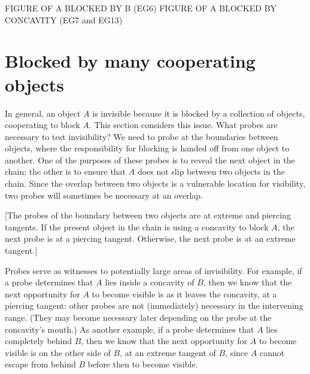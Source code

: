\documentclass[12pt]{article}
\begin{document}
FIGURE OF A BLOCKED BY B (EG6)
FIGURE OF A BLOCKED BY CONCAVITY (EG7 and EG13)




\section{Blocked by many cooperating objects}

In general, an object $A$ is invisible because it is blocked by 
a collection of objects, cooperating to block $A$.
This section considers this issue.
What probes are necessary to test invisibility?
We need to probe at the boundaries between objects, where the responsibility
for blocking is handed off from one object to another.
One of the purposes of these probes is to reveal the next object in the chain;
the other is to ensure that $A$ does not slip between two objects in the chain.
Since the overlap between two objects is a vulnerable location for visibility,
two probes will sometimes be necessary at an overlap.

[The probes of the boundary between two objects are at extreme and piercing tangents.
If the present object in the chain is using a concavity to block $A$, 
the next probe is at a piercing tangent.
Otherwise, the next probe is at an extreme tangent.]

Probes serve as witnesses to potentially large areas of invisibility.
For example, if a probe determines that $A$ lies inside a concavity of $B$,
then we know that the next opportunity for $A$ to become visible is as it leaves
the concavity, at a piercing tangent: 
other probes are not (immediately) necessary in the intervening range.
(They may become necessary later depending on the probe at the concavity's mouth.) 
As another example, if a probe determines that $A$ lies completely behind $B$,
then we know that the next opportunity for $A$ to become visible is on the other side
of $B$, at an extreme tangent of $B$, since $A$ cannot escape 
from behind $B$ before then to become visible.
\end{document}
